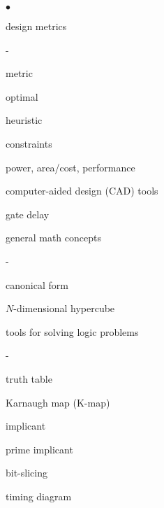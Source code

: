 \begin{minipage}[t]{2.8in}
\begin{list}{$\bullet$}{\setlength{\itemsep}{0pt}\setlength{\parskip}{0pt}%
\setlength{\topsep}{0pt}\setlength{\partopsep}{0pt}\setlength{\parsep}{0pt}}
\item{design metrics}
\begin{list}{-}{\setlength{\itemsep}{0pt}\setlength{\parskip}{0pt}%
\setlength{\topsep}{0pt}\setlength{\partopsep}{0pt}\setlength{\parsep}{0pt}}
\item{metric}
\item{optimal}
\item{heuristic}
\item{constraints}
\item{power, area/cost, performance}
\item{computer-aided design (CAD) tools}
\item{gate delay}
\end{list}

\item{general math concepts}
\begin{list}{-}{\setlength{\itemsep}{0pt}\setlength{\parskip}{0pt}%
\setlength{\topsep}{0pt}\setlength{\partopsep}{0pt}\setlength{\parsep}{0pt}}
\item{canonical form}
\item{\mbox{$N$-dimensional} hypercube}
\end{list}

\item{tools for solving logic problems}
\begin{list}{-}{\setlength{\itemsep}{0pt}\setlength{\parskip}{0pt}%
\setlength{\topsep}{0pt}\setlength{\partopsep}{0pt}\setlength{\parsep}{0pt}}
\item{truth table}
\item{Karnaugh map (K-map)}
\item{implicant}
\item{prime implicant}
\item{bit-slicing}
\item{timing diagram}
\end{list}

\end{list}
\end{minipage}\hspace{.70in}%
